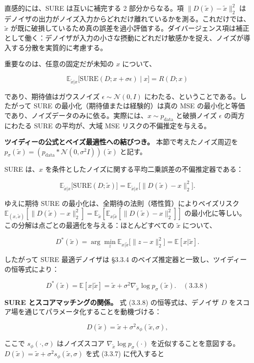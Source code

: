 直感的には、SURE は互いに補完する 2 部分からなる。項 $\|D(\tilde{x})-\tilde{x}\|_2^2$ はデノイザの出力がノイズ入力からどれだけ離れているかを測る。これだけでは、$\tilde{x}$ が既に破損しているため真の誤差を過小評価する。ダイバージェンス項は補正として働く：デノイザが入力の小さな摂動にどれだけ敏感かを捉え、ノイズが導入する分散を実質的に考慮する。

重要なのは、任意の固定だが未知の $x$ について、

\[
\mathbb{E}_{\tilde{x}|x}\bigl[\mathrm{SURE}(D;x+\sigma\epsilon)\mid x\bigr]=R(D;x)
\]


であり、期待値はガウスノイズ $\epsilon\sim\mathcal{N}(0,I)$ にわたる、ということである。したがって SURE の最小化（期待値または経験的）は真の MSE の最小化と等価であり、ノイズデータのみに依る。実際には、$x\sim p_{\mathrm{data}}$ と破損ノイズ $\epsilon$ の両方にわたる SURE の平均が、大域 MSE リスクの不偏推定を与える。

\textbf{ツイディーの公式とベイズ最適性への結びつき。} 本節で考えたノイズ周辺を $p_\sigma(\tilde{x})=(p_{\mathrm{data}}*\mathcal{N}(0,\sigma^2 I))(\tilde{x})$ と記す。

SURE は、$x$ を条件としたノイズに関する平均二乗誤差の不偏推定器である：

\[
\mathbb{E}_{\tilde{x}|x}\bigl[\mathrm{SURE}(D;\tilde{x})\bigr]
= \mathbb{E}_{\tilde{x}|x}\bigl[\|D(\tilde{x})-x\|_2^2\bigr].
\]


ゆえに期待 SURE の最小化は、全期待の法則（塔性質）によりベイズリスク $\mathbb{E}_{(x,\tilde{x})}[\|D(\tilde{x})-x\|_2^2]=\mathbb{E}_{\tilde{x}}[\mathbb{E}_{x|\tilde{x}}[\|D(\tilde{x})-x\|_2^2]]$ の最小化に等しい。この分解は点ごとの最適化を与える：ほとんどすべての $\tilde{x}$ について、

\[
D^*(\tilde{x})=\arg\min_z\mathbb{E}_{x|\tilde{x}}\bigl[\|z-x\|_2^2\bigr]=\mathbb{E}[x|\tilde{x}].
\]


したがって SURE 最適デノイザは §3.3.4 のベイズ推定器と一致し、ツイディーの恒等式により：

\[
D^*(\tilde{x})=\mathbb{E}[x|\tilde{x}]=\tilde{x}+\sigma^2\nabla_{\tilde{x}}\log p_\sigma(\tilde{x}).\quad (3.3.8)
\]


\textbf{SURE とスコアマッチングの関係。} 式 (3.3.8) の恒等式は、デノイザ $D$ をスコア場を通じてパラメータ化することを動機づける：

\[
D(\tilde{x})=\tilde{x}+\sigma^2 s_\phi(\tilde{x},\sigma),
\]


ここで $s_\phi(\cdot,\sigma)$ はノイズスコア $\nabla_{\tilde{x}}\log p_\sigma(\cdot)$ を近似することを意図する。$D(\tilde{x})=\tilde{x}+\sigma^2 s_\phi(\tilde{x},\sigma)$ を式 (3.3.7) に代入すると


